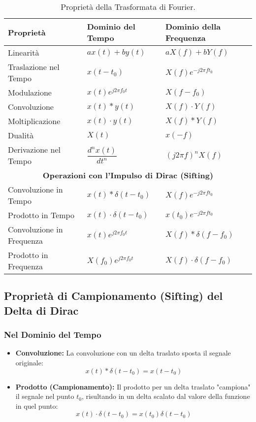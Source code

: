 \begin{table}[h!]
\centering
\caption{Proprietà della Trasformata di Fourier.}
\label{tab:ft_properties}
\begin{tabular}{lll}
    \toprule
    \textbf{Proprietà} & \textbf{Dominio del Tempo} & \textbf{Dominio della Frequenza} \\
    \midrule
    Linearità & $a x(t) + b y(t)$ & $a X(f) + b Y(f)$ \\
    \addlinespace
    Traslazione nel Tempo & $x(t - t_0)$ & $X(f) e^{-j2\pi f t_0}$ \\
    \addlinespace
    Modulazione & $x(t) e^{j2\pi f_0 t}$ & $X(f - f_0)$ \\
    \addlinespace
    Convoluzione & $x(t) * y(t)$ & $X(f) \cdot Y(f)$ \\
    \addlinespace
    Moltiplicazione & $x(t) \cdot y(t)$ & $X(f) * Y(f)$ \\
    \addlinespace
    Dualità & $X(t)$ & $x(-f)$ \\
    \addlinespace
    Derivazione nel Tempo & $\dfrac{d^n x(t)}{dt^n}$ & $(j2\pi f)^n X(f)$ \\
    \midrule
    \multicolumn{3}{c}{\textbf{Operazioni con l'Impulso di Dirac (Sifting)}} \\
    \midrule
    Convoluzione in Tempo & $x(t) * \delta(t-t_0)$ & $X(f) e^{-j2\pi f t_0}$ \\
    \addlinespace
    Prodotto in Tempo & $x(t) \cdot \delta(t-t_0)$ & $x(t_0) e^{-j2\pi f t_0}$ \\
    \addlinespace
    Convoluzione in Frequenza & $x(t) e^{j2\pi f_0 t}$ & $X(f) * \delta(f-f_0)$ \\
    \addlinespace
    Prodotto in Frequenza & $X(f_0) e^{j2\pi f_0 t}$ & $X(f) \cdot \delta(f-f_0)$ \\
    \bottomrule
\end{tabular}
\end{table}

\subsection*{Proprietà di Campionamento (Sifting) del Delta di Dirac}
\subsubsection*{Nel Dominio del Tempo}
\begin{itemize}
    \item \textbf{Convoluzione:} La convoluzione con un delta traslato sposta il segnale originale:
    \begin{equation*}
        x(t) * \delta(t-t_0) = x(t-t_0)
    \end{equation*}
    
    \item \textbf{Prodotto (Campionamento):} Il prodotto per un delta traslato "campiona" il segnale nel punto $t_0$, risultando in un delta scalato dal valore della funzione in quel punto:
    \begin{equation*}
        x(t) \cdot \delta(t-t_0) = x(t_0) \delta(t-t_0)
    \end{equation*}
\end{itemize}

